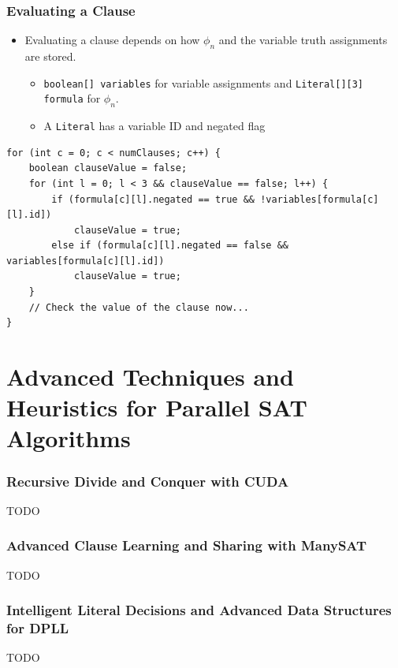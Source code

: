 \documentclass[handout]{beamer}
\begin{document}
\begin{frame}[fragile]
	\frametitle{Evaluating a Clause}
\begin{itemize}
	\item Evaluating a clause depends on how $\phi_n$ and the variable truth assignments are stored.
	\begin{itemize}
		\item {\tt boolean[] variables} for variable assignments and {\tt Literal[][3] formula} for $\phi_n$.
		\item A {\tt Literal} has a variable ID and negated flag
	\end{itemize}
\end{itemize}
{\small
\begin{lstlisting}
for (int c = 0; c < numClauses; c++) {
    boolean clauseValue = false;
    for (int l = 0; l < 3 && clauseValue == false; l++) {
        if (formula[c][l].negated == true && !variables[formula[c][l].id])
            clauseValue = true;
        else if (formula[c][l].negated == false && variables[formula[c][l].id])
            clauseValue = true; 
    }
    // Check the value of the clause now...
}
\end{lstlisting}
}
\end{frame}

\section{Advanced Techniques and Heuristics for Parallel SAT Algorithms}
\begin{frame}
	\frametitle{Recursive Divide and Conquer with CUDA}
	TODO
\end{frame}

\begin{frame}
	\frametitle{Advanced Clause Learning and Sharing with ManySAT}
	TODO
\end{frame}

\begin{frame}
	\frametitle{Intelligent Literal Decisions and Advanced Data Structures for DPLL}
	TODO
\end{frame}
\end{document}
